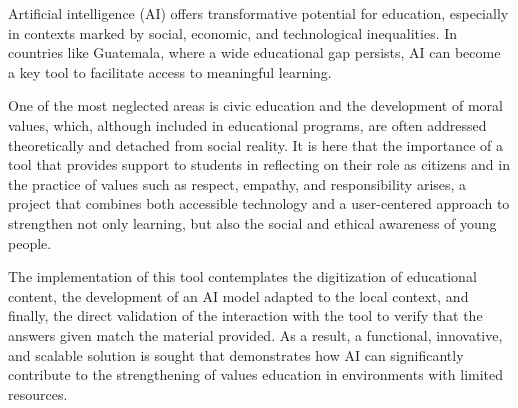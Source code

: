 Artificial intelligence (AI) offers transformative potential for education, especially in contexts marked by social, economic, and technological inequalities. In countries like Guatemala, where a wide educational gap persists, AI can become a key tool to facilitate access to meaningful learning.

One of the most neglected areas is civic education and the development of moral values, which, although included in educational programs, are often addressed theoretically and detached from social reality. It is here that the importance of a tool that provides support to students in reflecting on their role as citizens and in the practice of values such as respect, empathy, and responsibility arises, a project that combines both accessible technology and a user-centered approach to strengthen not only learning, but also the social and ethical awareness of young people.

The implementation of this tool contemplates the digitization of educational content, the development of an AI model adapted to the local context, and finally, the direct validation of the interaction with the tool to verify that the answers given match the material provided. As a result, a functional, innovative, and scalable solution is sought that demonstrates how AI can significantly contribute to the strengthening of values education in environments with limited resources.